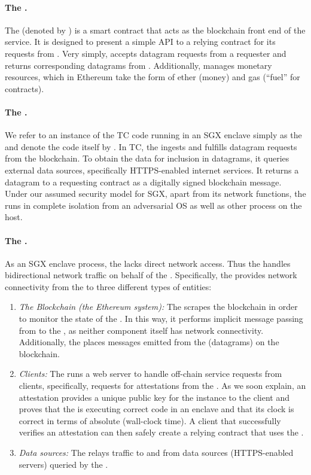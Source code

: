 {\paragraph{The \tcontract \tcont.} The \tcontract (denoted by \tcont) is a smart contract that acts as the blockchain front end of the \tc service. It is designed to present a simple API to a relying contract \reqcont for its requests from \tc. Very simply, \tcont accepts datagram requests from a requester \reqcont and returns corresponding datagrams from \tc. Additionally, \tcont manages \tc monetary resources, which in Ethereum take the form of ether (money) and gas (``fuel'' for contracts).

\paragraph{The \encname.}
We refer to an instance of the TC code running in an SGX enclave simply as the \encname and denote the code itself by  \engine. In TC, the \encname ingests and fulfills datagram requests from the blockchain. To obtain the data for inclusion in datagrams, it queries external data sources, specifically HTTPS-enabled internet services. It returns a datagram to a requesting contract \reqcont as a digitally signed blockchain message. Under our assumed security model for SGX, apart from its network functions, the \encname runs in complete isolation from an adversarial OS as well as other process on the host. 

\paragraph{The \medname \relay.} As an SGX enclave process, the \encname lacks direct network access. Thus the \medname handles bidirectional network traffic on behalf of the \encname. Specifically, the \medname provides network connectivity from the \encname to three different types of entities: 

\begin{enumerate}
\item {\em The Blockchain (the Ethereum system):}  The \medname scrapes the blockchain in order to monitor the state of the \tcontract  \tcont. In this way, it performs implicit message passing from \tcont to the \encname, as neither component itself has network connectivity. Additionally, the \medname places messages emitted from the \encname (datagrams) on the blockchain.
\item {\em Clients:} The \medname runs a web server to handle off-chain service requests from clients, specifically, requests for attestations from the \encname. As we soon explain, an attestation provides a unique public key for the \encname instance to the  client and proves that the \encname is executing correct code in an enclave and that its clock is correct in terms of absolute (wall-clock time). A client that successfully verifies an attestation can then safely create a relying contract \reqcont that uses the \tc.
\item {\em Data sources:} The \medname relays traffic to and from data sources (HTTPS-enabled servers) queried by the \encname. 
\end{enumerate}

}
